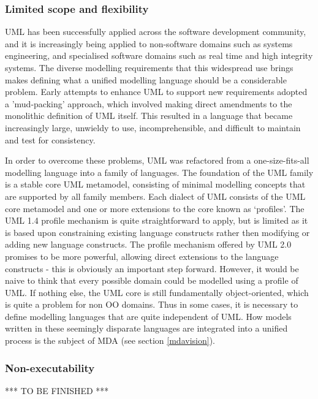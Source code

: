\subsubsection*{Limited scope and flexibility}

UML has been successfully applied across the software development community, and it is increasingly being applied to non-software domains such as systems engineering\cite{umlse}, and specialised software domains such as real time and high integrity systems. The diverse modelling requirements that this widespread use brings makes defining what a unified modelling language should be a considerable problem. Early attempts to enhance UML to support new requirements adopted a 'mud-packing' approach\cite{kobryn}, which involved making direct amendments to the monolithic definition of UML itself. This resulted in a language that became increasingly large, unwieldy to use, incomprehensible, and difficult to maintain and test for consistency.

In order to overcome these problems, UML was refactored from a one-size-fits-all modelling language into a family of languages. The foundation of the UML family is a stable core UML metamodel, consisting of minimal modelling concepts that are supported by all family members. Each dialect of UML consists of the UML core metamodel and one or more extensions to the core known as `profiles'. The UML 1.4 profile mechanism is quite straightforward to apply, but is limited as it is based upon constraining existing language constructs rather then modifying or adding new language constructs. The profile mechanism offered by UML 2.0 promises to be more powerful, allowing direct extensions to the language constructs - this is obviously an important step forward. However, it would be naive to think that every possible domain could be modelled using a profile of UML. If nothing else, the UML core is still fundamentally object-oriented, which is quite a problem for non OO domains. Thus in some cases, it is necessary to define modelling languages that are quite independent of UML. How models written in these seemingly disparate languages are integrated into a unified process is the subject of MDA (see section \ref{mdavision}).

\subsubsection*{Non-executability}

*** TO BE FINISHED ***

